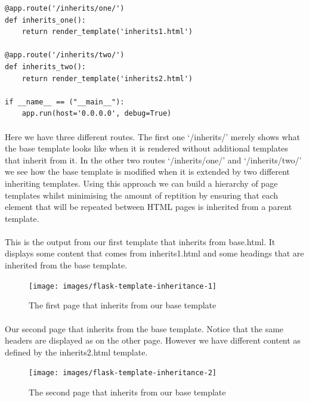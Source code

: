 \documentclass[12pt, a4paper, oneside]{book}
\begin{document}
{\begin{lstlisting}
@app.route('/inherits/one/')
def inherits_one():
    return render_template('inherits1.html')

@app.route('/inherits/two/')
def inherits_two():
    return render_template('inherits2.html')

if __name__ == ("__main__"):
    app.run(host='0.0.0.0', debug=True)
\end{lstlisting}

\paragraph{} Here we have three different routes. The first one `/inherits/' merely shows what the base template looks like when it is rendered without additional templates that inherit from it. In the other two routes `/inherits/one/' and `/inherits/two/' we see how the base template is modified when it is extended by two different inheriting templates. Using this approach we can build a hierarchy of page templates whilst minimising the amount of reptition by ensuring that each element that will be repeated between HTML pages is inherited from a parent template.

\paragraph{} This is the output from our first template that inherits from base.html. It displays some content that comes from inherits1.html and some headings that are inherited from the base template.

\begin{figure}[H]
\centering
\texttt{[image: images/flask-template-inheritance-1]}
\caption{The first page that inherits from our base template}
\label{fig:flask-template-inheritance-1}
\end{figure}

\paragraph{} Our second page that inherits from the base template. Notice that the same headers are displayed as on the other page. However we have different content as defined by the inherits2.html template.

\begin{figure}[H]
\centering
\texttt{[image: images/flask-template-inheritance-2]}
\caption{The second page that inherits from our base template}
\label{fig:flask-template-inheritance-2}
\end{figure}

}
\end{document}
